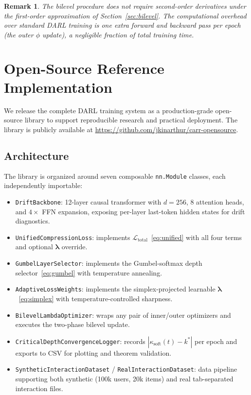 \documentclass[lettersize,journal]{IEEEtran}
\newtheorem{remark}{Remark}
\newcommand{\calL}{\mathcal{L}}
\newcommand{\lambdavec}{\boldsymbol{\lambda}}
\begin{document}
\begin{remark}
The bilevel procedure does not require second-order derivatives
under the first-order approximation of Section~\ref{sec:bilevel}.
The computational overhead over standard DARL training is one
extra forward and backward pass per epoch (the outer $\phi$ update),
a negligible fraction of total training time.
\end{remark}


\section{Open-Source Reference Implementation}
\label{sec:library}

We release the complete DARL training system as a
production-grade open-source library to support reproducible
research and practical deployment.
The library is publicly available at
\url{https://github.com/jkinarthur/carr-opensource}.

\subsection{Architecture}

The library is organized around seven composable
\texttt{nn.Module} classes, each independently importable:
\begin{itemize}
  \item \texttt{DriftBackbone}: 12-layer causal transformer with
    $d=256$, 8 attention heads, and $4\times$ FFN expansion,
    exposing per-layer last-token hidden states for drift
    diagnostics.
  \item \texttt{UnifiedCompressionLoss}: implements
    $\calL_{\text{total}}$~\eqref{eq:unified} with all four terms
    and optional $\lambdavec$ override.
  \item \texttt{GumbelLayerSelector}: implements the
    Gumbel-softmax depth selector~\eqref{eq:gumbel} with
    temperature annealing.
  \item \texttt{AdaptiveLossWeights}: implements the simplex-projected
    learnable $\lambdavec$~\eqref{eq:simplex} with temperature-controlled
    sharpness.
  \item \texttt{BilevelLambdaOptimizer}: wraps any pair of inner/outer
    optimizers and executes the two-phase bilevel update.
  \item \texttt{CriticalDepthConvergenceLogger}: records
    $|\kappa_{\text{soft}}(t) - k^*|$ per epoch and exports to CSV
    for plotting and theorem validation.
  \item \texttt{SyntheticInteractionDataset} / \texttt{RealInteractionDataset}:
    data pipeline supporting both synthetic (100k users, 20k items)
    and real tab-separated interaction files.
\end{itemize}
\end{document}
